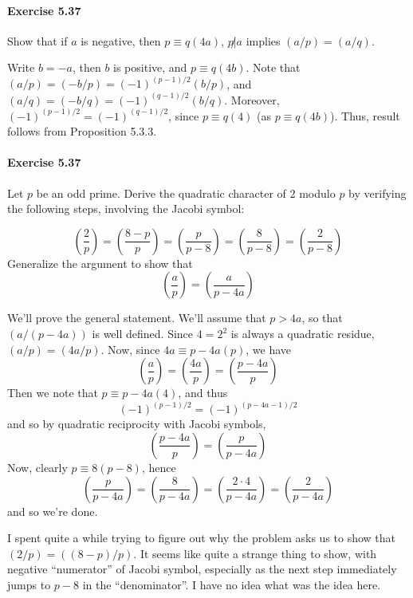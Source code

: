 \documentclass[notitlepage]{article}
\theoremstyle{definition}
\begin{document}
\paragraph{Exercise 5.37}
Show that if $a$ is negative, then $p \equiv q (4a)$, $p \not | a$ implies $(a/p) = (a/q)$.

Write $b = -a$, then $b$ is positive, and $p \equiv q (4b)$. Note that
$(a/p) = (-b/p) = (-1)^{(p-1)/2} (b/p)$, and $(a/q) = (-b/q) =
(-1)^{(q-1)/2} (b/q)$. Moreover, $(-1)^{(p-1)/2} = (-1)^{(q-1)/2}$,
since $p \equiv q (4)$ (as $p \equiv q (4b)$). Thus, result follows
from Proposition 5.3.3.

\paragraph{Exercise 5.37}
Let $p$ be an odd prime. Derive the quadratic character of $2$ modulo
$p$ by verifying the following steps, involving the Jacobi symbol:

\begin{equation}
  \left(\frac{2}{p}\right) = \left(\frac{8-p}{p}\right) =
  \left(\frac{p}{p-8}\right) = \left(\frac{8}{p-8}\right) =
  \left(\frac{2}{p-8}\right)
\end{equation}
Generalize the argument to show that
\begin{equation}
  \left(\frac{a}{p}\right) = \left(\frac{a}{p-4a}\right)
\end{equation}

We'll prove the general statement. We'll assume that $p > 4a$, so that
$(a/(p-4a))$ is well defined. Since $4 = 2^2$ is always a quadratic
residue, $(a/p) = (4a/p)$. Now, since $4a \equiv p-4a (p)$, we have
\begin{equation}
  \left(\frac{a}{p}\right) = \left(\frac{4a}{p}\right) =
  \left(\frac{p-4a}{p}\right)
\end{equation}
Then we note that $p \equiv p-4a (4)$, and thus
\begin{equation}
  (-1)^{(p-1)/2} = (-1)^{(p-4a-1)/2}
\end{equation}
and so by quadratic reciprocity with Jacobi symbols,
\begin{equation}
  \left(\frac{p-4a}{p}\right) = \left(\frac{p}{p-4a}\right)
\end{equation}
Now, clearly $p \equiv 8 (p-8)$, hence
\begin{equation}
\left(\frac{p}{p-4a}\right) = \left(\frac{8}{p-4a}\right) =
\left(\frac{2 \cdot 4}{p-4a}\right) = \left(\frac{2}{p-4a}\right)
\end{equation}
and so we're done.

I spent quite a while trying to figure out why the problem asks us to
show that $(2/p) = ((8-p)/p)$. It seems like quite a strange thing to
show, with negative ``numerator'' of Jacobi symbol, especially as the
next step immediately jumps to $p-8$ in the ``denominator''. I have no
idea what was the idea here.
\end{document}
